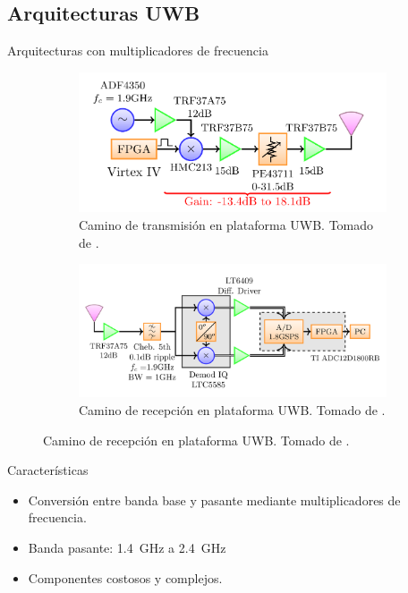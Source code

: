 \documentclass{beamer}
\begin{document}
\subsection{Arquitecturas UWB}

\begin{frame}{Arquitecturas con multiplicadores de frecuencia}
    \begin{figure}[t]
        \centering
        \begin{subfigure}[b]{0.45\textwidth}
            \centering
            \includegraphics[width=\textwidth]{images/uwb_system_tx_path.png}
            \caption{Camino de transmisión en plataforma UWB. Tomado de
            \cite{Altieri2021}.}
            \label{fig:uwb_system_tx_path}
        \end{subfigure}
        \hfill
        \begin{subfigure}[b]{0.45\textwidth}
            \centering
            \includegraphics[width=\textwidth]{images/uwb_system_rx_path.png}
            \caption{Camino de recepción en plataforma UWB. Tomado de
            \cite{Altieri2021}.}
            \label{fig:uwb_system_rx_path}
        \end{subfigure}
        \label{fig:uwb_system_block_diagram}
    \end{figure}
    \begin{block}{Características}
        \begin{itemize}
            \item Conversión entre banda base y pasante mediante multiplicadores
                de frecuencia.
            \item Banda pasante: \qty{1.4}{\giga\hertz} a \qty{2.4}{\giga\hertz}
            \item Componentes costosos y complejos.
        \end{itemize}
    \end{block}
\end{frame}
\end{document}
